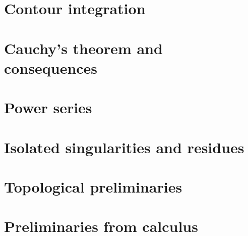 \chapter{Contour integration}


\chapter{Cauchy's theorem and consequences}



\chapter{Power series}


\chapter{Isolated singularities and residues}


\appendix

\chapter{Topological preliminaries}


\chapter{Preliminaries from calculus}

